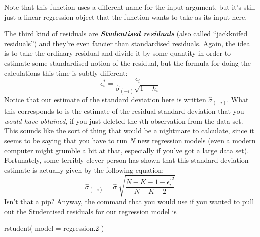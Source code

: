 \documentclass[
]{book}
\newenvironment{Shaded}{\begin{snugshade}}{\end{snugshade}}
\newcommand{\AttributeTok}[1]{\textcolor[rgb]{0.77,0.63,0.00}{#1}}
\newcommand{\FloatTok}[1]{\textcolor[rgb]{0.00,0.00,0.81}{#1}}
\newcommand{\FunctionTok}[1]{\textcolor[rgb]{0.00,0.00,0.00}{#1}}
\newcommand{\NormalTok}[1]{#1}
\begin{document}
Note that this function uses a different name for the input argument, but it's still just a linear regression object that the function wants to take as its input here.

The third kind of residuals are \textbf{\emph{Studentised residuals}} (also called ``jackknifed residuals'') and they're even fancier than standardised residuals. Again, the idea is to take the ordinary residual and divide it by some quantity in order to estimate some standardised notion of the residual, but the formula for doing the calculations this time is subtly different:
\[
\epsilon_{i}^* = \frac{\epsilon_i}{\hat{\sigma}_{(-i)} \sqrt{1-h_i}}
\]
Notice that our estimate of the standard deviation here is written \(\hat{\sigma}_{(-i)}\). What this corresponds to is the estimate of the residual standard deviation that you \emph{would have obtained}, if you just deleted the \(i\)th observation from the data set. This sounds like the sort of thing that would be a nightmare to calculate, since it seems to be saying that you have to run \(N\) new regression models (even a modern computer might grumble a bit at that, especially if you've got a large data set). Fortunately, some terribly clever person has shown that this standard deviation estimate is actually given by the following equation:
\[
\hat\sigma_{(-i)} = \hat{\sigma} \ \sqrt{\frac{N-K-1 - {\epsilon_{i}^\prime}^2}{N-K-2}}
\]
Isn't that a pip? Anyway, the command that you would use if you wanted to pull out the Studentised residuals for our regression model is

\begin{Shaded}
\begin{Highlighting}[]
\FunctionTok{rstudent}\NormalTok{( }\AttributeTok{model =}\NormalTok{ regression}\FloatTok{.2}\NormalTok{ )}
\end{Highlighting}
\end{Shaded}
\end{document}
